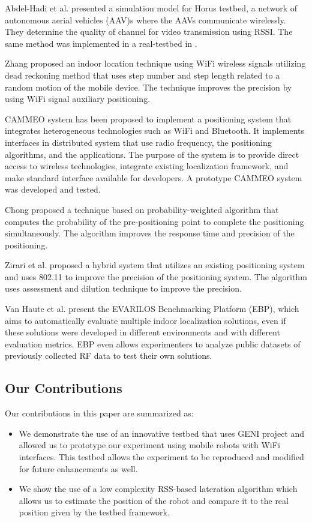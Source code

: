 \documentclass[journal]{IEEEtran} 				\IEEEoverridecommandlockouts 						\usepackage{amsmath,amssymb}
\begin{document}
Abdel-Hadi et al. \cite{Ahmed_VTC10} presented a simulation model for Horus testbed, a network of autonomous aerial vehicles (AAV)s where the AAVs communicate wirelessly. They determine the quality of channel for video transmission using RSSI. The same method was implemented in a real-testbed in \cite{Ahmed_Horus_project}.

Zhang \cite{ Zhang2011} proposed an indoor location technique using WiFi wireless signals utilizing dead reckoning method that uses step number and step length related to a random motion of the mobile device. The technique improves the precision by using WiFi signal auxiliary positioning.

CAMMEO \cite{ loreti2012} system has been proposed to implement a positioning system that integrates heterogeneous technologies such as WiFi and Bluetooth. It implements interfaces in distributed system that use radio frequency, the positioning algorithms, and the applications. The purpose of the system is to provide direct access to wireless technologies, integrate existing localization framework, and make standard interface available for developers. A prototype CAMMEO system was developed and tested.

Chong \cite{Chong2013} proposed a technique based on probability-weighted algorithm that computes the probability of the pre-positioning point to complete the positioning simultaneously. The algorithm improves the response time and precision of the positioning.

Zirari et al. \cite{zirari2013} proposed a hybrid system that utilizes an existing positioning system and uses 802.11 to improve the precision of the positioning system. The algorithm uses assessment and dilution technique to improve the precision.

Van Haute et al. \cite{vanhaute15_platform} present the EVARILOS Benchmarking Platform (EBP), which aims to automatically evaluate multiple indoor localization solutions, even if these solutions were developed in different environments and with different evaluation metrics. EBP even allows experimenters to analyze public datasets of previously collected RF data to test their own solutions.

\subsection{Our Contributions}\label{sec:contributions}

Our contributions in this paper are summarized as:
\begin{itemize}
	\item We demonstrate the use of an innovative testbed \cite{becue2012} that uses GENI project and allowed us to prototype our experiment using mobile robots with WiFi interfaces. This testbed allows the experiment to be reproduced and modified for future enhancements as well.
	\item We show the use of a low complexity RSS-based lateration algorithm which allows us to estimate the position of the robot and compare it to the real position given by the testbed framework.
\end{itemize}
\end{document}
